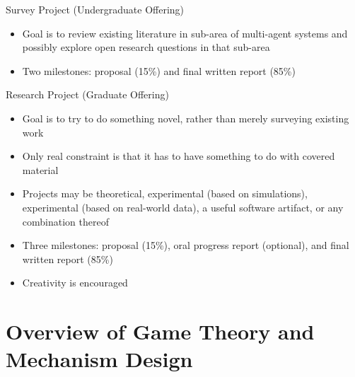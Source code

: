 \documentclass[11pt,aspectratio=169,handout]{beamer}
\begin{document}
  \begin{frame}{Survey Project (Undergraduate Offering)}
   \begin{itemize}
   \setlength{\itemsep}{1em}
    \item Goal is to review existing literature in sub-area of multi-agent systems and possibly explore open research questions in that sub-area
    \item Two milestones: proposal (15\%) and final written report (85\%)
   \end{itemize}
  \end{frame}
 
  \begin{frame}{Research Project (Graduate Offering)}
   \begin{itemize}
   \setlength{\itemsep}{1em}
   \item Goal is to try to do something novel, rather than merely surveying existing work
   \item Only real constraint is that it has to have something to do with covered material
   \item Projects may be theoretical, experimental (based on simulations), experimental (based on real-world data), a useful software artifact, or any combination thereof
   \item Three milestones: proposal (15\%), oral progress report (optional), and final written report (85\%)
   \item Creativity is encouraged
   \end{itemize}
  \end{frame}
 
 \section{Overview of Game Theory and Mechanism Design}
 
\end{document}
